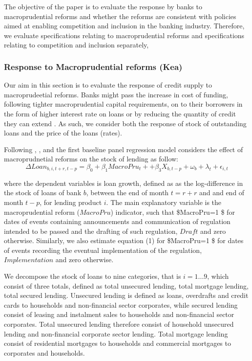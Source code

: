 \documentclass[
  letterpaper,
  DIV=11,
  numbers=noendperiod]{scrartcl}
\begin{document}
The objective of the paper is to evaluate the response by banks to
macroprudential reforms and whether the reforms are consistent with
policies aimed at enabling competition and inclusion in the banking
industry. Therefore, we evaluate specifications relating to
macroprudential reforms and specifications relating to competition and
inclusion separately,

\subsubsection{Response to Macroprudential reforms
(Kea)}\label{response-to-macroprudential-reforms-kea}

Our aim in this section is to evaluate the response of credit supply to
macroprudeetial reforms. Banks might pass the increase in cost of
funding, following tighter macroprudential capital requirements, on to
their borrowers in the form of higher interest rate on loans or by
reducing the quantity of credit they can extend
\citep{noss2016estimating}. As such, we consider both the response of
stock of outstanding loans and the price of the loans (rates).

Following \cite{aiyar2016does}, \cite{deli2017real}, \cite{fang2022bank}
and \cite{mirzaei2022effectiveness} the first baseline panel regression
model considers the effect of macroprudnetial reforms on the stock of
lending as follow: \begin{equation}
    \Delta Loan_{b,i,t+r,t-p}=\beta_{0}+ \beta_{1}MacroPru_{t}++\beta_{3}X_{b,t-p}+ \omega_{b}+ \lambda_{t}+\epsilon_{i,t}
\end{equation}

where the dependent variables is loan growth, defined as as the
log-difference in the stock of loans of bank \(b\), between the end of
month \(t=r+r\) and and end of month \(t-p\), for lending product \(i\).
The main explanatory variable is the macroprudential reform
(\(MacroPru\)) indicator, such that \$MacroPru=1 \$ for dates of events
containing announcements and communication of regulation intended to be
passed and the drafting of such regulation, \(Draft\) and zero
otherwise. Similarly, we also estimate equation (1) for \$MacroPru=1 \$
for dates of events recording the eventual implementation of the
regulation, \(Implementation\) and zero otherwise.

We decompose the stock of loans to nine categories, that is \(i=1...9\),
which consist of three totals, defined as total unsecured lending, total
mortgage lending, total secured lending. Unsecured lending is defined as
loans, overdrafts and credit cards to households and non-financial
sector corporates, while secured lending consist of leasing and
instalment sales to households and non-financial sector corporates.
Total unsecured lending therefore consist of household unsecured lending
and non-financial corporate sector lending. Total mortgage lending
consist of residential mortgages to households and commercial mortgages
to corporates and households.
\end{document}
